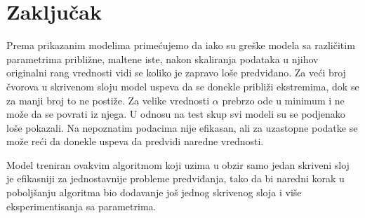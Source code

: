 \documentclass[a4paper]{article}
\begin{document}
\pagebreak

\restoregeometry
\section{Zaključak}

Prema prikazanim modelima primećujemo da iako su greške modela sa različitim parametrima približne, maltene iste, nakon skaliranja podataka u njihov originalni rang vrednosti vidi se koliko je zapravo loše predviđano. 
Za veći broj čvorova u skrivenom sloju model uspeva da se donekle približi ekstremima, dok se za manji broj to ne postiže. Za velike vrednosti $\alpha$ prebrzo ode u minimum i ne može da se povrati iz njega. U odnosu na test skup svi modeli su se podjenako loše pokazali. Na nepoznatim podacima nije efikasan, ali za uzastopne podatke se može reći da donekle uspeva da predvidi naredne vrednosti.

Model treniran ovakvim algoritmom koji uzima u obzir samo jedan skriveni sloj je efikasniji za jednostavnije probleme predviđanja, tako da bi naredni korak u poboljšanju algoritma bio dodavanje još jednog skrivenog sloja i više eksperimentisanja sa parametrima.

\appendix
 


\end{document}
